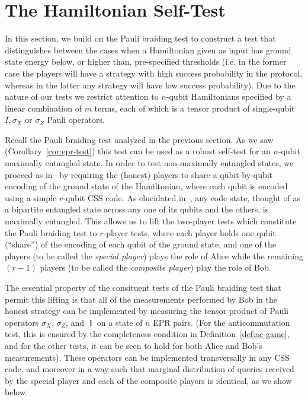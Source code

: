 \documentclass[11pt,letterpaper]{article}
\newcommand{\<}{\langle}
\renewcommand{\>}{\rangle}
\DeclareMathOperator{\Id}{\mathbb{I}}
\begin{document}
\section{The Hamiltonian Self-Test}
\label{sec:manyprovers}

In this section, we build on the Pauli braiding test to construct a test that distinguishes between the cases when a Hamiltonian given as input has ground state energy below, or higher than, pre-specified thresholds (i.e. in the former case the players will have a strategy with high success probability in the protocol, whereas in the latter any strategy will have low success probability).
Due to the nature of our tests we restrict attention to $n$-qubit Hamiltonians specified by a linear combination of $m$ terms, each of which is a tensor product of single-qubit $I, \sigma_X$ or $\sigma_Z$ Pauli operators. 

Recall the Pauli braiding test analyzed in the previous section. As we saw (Corollary~\ref{cor:epr-test}) this test can be used as a robust self-test for an $n$-qubit maximally entangled state. In order to test non-maximally entangled states, we
proceed as in~\cite{FV14,ji2015classical} by requiring the (honest) players to share a qubit-by-qubit encoding of the ground state of the Hamiltonian, where each qubit is encoded using a simple $r$-qubit CSS code. As elucidated
in~\cite{ji2015classical}, any code state, thought of as a bipartite entangled state
across any one of its qubits and the others, is maximally entangled. This allows us to lift the two-player tests which constitute the Pauli braiding test to $r$-player tests, where each player holds one qubit (``share'') of the encoding of each qubit of the ground state, and one of
the players (to be called the \emph{special player}) plays the role of Alice while the remaining $(r - 1)$ players (to be called the \emph{composite player})
play the role of Bob. 

The essential property of the consituent tests of the Pauli braiding test that permit this lifting is that all of the measurements performed by Bob in the honest
strategy can be implemented by measuring the tensor
product of Pauli operators $\sigma_X$, $\sigma_Z$, and $\Id$ on a state of $n$
EPR pairs. (For the anticommutation test, this is ensured by the completeness
condition in Definition~\ref{def:ac-game}, and for the other tests, it can be
seen to hold for both Alice and Bob's measurements). These operators can be implemented
transversally in any CSS code, and moreover in a way such that marginal
distribution of queries received by the special player and each of the composite
players is identical, as we show below. 
\end{document}
